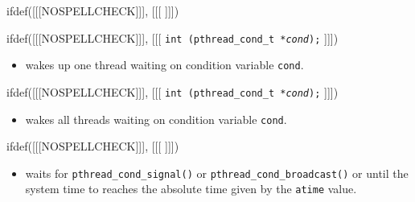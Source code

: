 
ifdef([[[NOSPELLCHECK]]], [[[
]]])

\begin{slide}
\prgchars
ifdef([[[NOSPELLCHECK]]], [[[
\texttt{int (pthread\_cond\_t *\emph{cond});}
]]])
\begin{itemize}
\item wakes up one thread waiting on condition variable
\texttt{cond}.
\end{itemize}
ifdef([[[NOSPELLCHECK]]], [[[
\texttt{int (pthread\_cond\_t *\emph{cond});}
]]])
\begin{itemize}
\item wakes all threads waiting on condition variable
\texttt{cond}.
\end{itemize}
ifdef([[[NOSPELLCHECK]]], [[[
]]])
\begin{itemize}
\item waits for \texttt{pthread\_cond\_signal()} or
\texttt{pthread\_cond\_broadcast()} or until the system time to reaches the
absolute time given by the \texttt{atime} value.
\end{itemize}
\end{slide}

